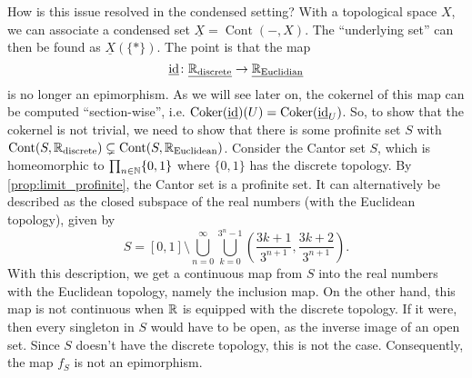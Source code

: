 \documentclass{article}
\DeclareMathOperator{\Cont}{Cont}
\DeclareMathOperator{\id}{id}
\begin{document}
How is this issue resolved in the condensed setting?
With a topological space $X$, we can associate a
condensed set $\underline{X} = \Cont(-, X)$. The
``underlying set'' can then be found as $\underline{X}(\{*\})$.
The point is that the map
\begin{equation*}
    \underline{\id}\colon \underline{\bbR_{\text{discrete}}} \to \underline{\bbR_{\text{Euclidian}}}
\end{equation*}
is no longer an epimorphism. As we will see later on, the cokernel
of this map can be computed ``section-wise'', i.e.
$\Coker(\underline{\id})(U) = \Coker(\underline{\id}_U)$.
So, to show that the cokernel is not trivial, we need to show that
there is some profinite set $S$ with
$\Cont(S, \bbR_{\text{discrete}}) \subsetneq \Cont(S,\bbR_{\text{Euclidean}})$.
Consider the Cantor set $S$, which is homeomorphic to $\prod_{n\in \mathbb{N}}\{0,1\}$
where $\{0,1\}$ has the discrete topology. By \cref{prop:limit_profinite}, the
Cantor set is a profinite set. It can alternatively be described as the
closed subspace of the real numbers (with the Euclidean topology), given by
\begin{equation*}
    S = [0,1]\setminus \bigcup_{n=0}^\infty \bigcup_{k=0}^{3^n-1}
    \left(\frac{3k+1}{3^{n+1}},\frac{3k+2}{3^{n+1}}\right).
\end{equation*}
With this description, we get a continuous map from $S$ into the real numbers
with the Euclidean topology, namely the inclusion map. On the other hand,
this map is not continuous when $\mathbb{R}$ is equipped with the discrete topology.
If it were, then every singleton in $S$ would have to be open, as the inverse
image of an open set. Since $S$ doesn't have the discrete topology, this is
not the case. Consequently, the map $f_S$ is not an epimorphism.
\end{document}
